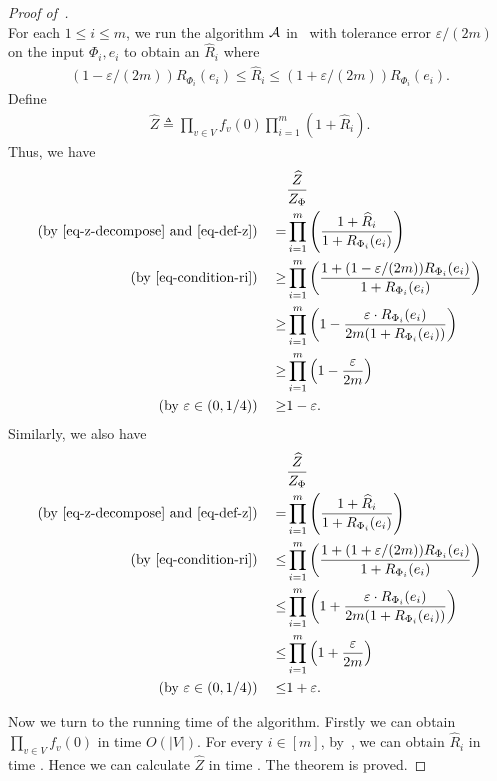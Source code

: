 \documentclass[11pt]{article}
\newcommand{\abs}[1]{\left\vert#1\right\vert}
\def\poly{\mathrm{poly}}
\newcommand{\wh}[1]{\widehat{#1}}
\newcommand{\hktodo}[1]{{\color{blue}{#1}}}
\begin{document}
\begin{proof}[Proof of~]
\begin{equation}
    \end{equation}
For each $1 \le i \le m$, we run the algorithm $\mathcal{A}$ in~ with tolerance error $\varepsilon/(2m)$ on the input $\Phi_i, e_i$ to obtain an $\wh{R}_i$
where 
\begin{align}\label{eq-condition-ri}
(1-\varepsilon/(2m))R_{\Phi_i}(e_i) \leq \wh{R}_i \leq (1+\varepsilon/(2m))R_{\Phi_i}(e_i).
\end{align}
Define 
\begin{align}\label{eq-def-z}
\wh{Z} \triangleq \prod_{v \in V} f_v(0) \prod_{i = 1}^{m} (1 + \wh{R}_i).
\end{align}
Thus, we have 
 \begin{align*}
    &\frac{\wh{Z}}{Z_\Phi} \\
\left(\text{by \eqref{eq-z-decompose} and \eqref{eq-def-z}}\right)\quad    = &\prod_{i = 1}^{m} \left( \frac{1 + \wh{R}_i}{1 + R_{\Phi_i}(e_i)}\right)\\ 
\left(\text{by \eqref{eq-condition-ri}}\right)\quad    \ge &\prod_{i = 1}^{m}  \left( \frac{1+(1-\varepsilon/(2m))R_{\Phi_i}(e_i) }{1 + R_{\Phi_i}(e_i)}\right)\\
 \ge &\prod_{i = 1}^{m} \left(1- \frac{\varepsilon\cdot R_{\Phi_i}(e_i)}{2m(1 + R_{\Phi_i}(e_i))}\right)\\ 
  \ge &\prod_{i = 1}^{m} \left(1- \frac{\varepsilon}{2m}\right)\\
\left(\text{by $\varepsilon\in (0,1/4)$}\right)\quad   \ge & 1 - \varepsilon.
\end{align*}
Similarly, we also have 
\begin{align*}
     &\frac{\wh{Z}}{Z_\Phi} \\
\left(\text{by \eqref{eq-z-decompose} and \eqref{eq-def-z}}\right)\quad    = &\prod_{i = 1}^{m} \left( \frac{1 + \wh{R}_i}{1 + R_{\Phi_i}(e_i)}\right)\\ 
\left(\text{by \eqref{eq-condition-ri}}\right)\quad    \leq &\prod_{i = 1}^{m}  \left( \frac{1+(1+\varepsilon/(2m))R_{\Phi_i}(e_i) }{1 + R_{\Phi_i}(e_i)}\right)
\\ \leq &\prod_{i = 1}^{m} \left(1+ \frac{\varepsilon\cdot R_{\Phi_i}(e_i)}{2m(1 + R_{\Phi_i}(e_i))}\right)\\ 
\leq&\prod_{i = 1}^{m} \left(1+ \frac{\varepsilon}{2m}\right) \\
\left(\text{by $\varepsilon\in (0,1/4)$}\right)\quad\le& 1 + \varepsilon.
\end{align*}

Now we turn to the running time of the algorithm.
Firstly we can obtain $\prod_{v \in V} f_v(0)$ in time $O(\abs{V})$. For every $i \in [m]$, by~, we can obtain $\wh{R}_i$ in time \hktodo{$\poly\left((m/\varepsilon)^{C(\Delta, r)}\right)\leq $}. Hence we can calculate $\wh{Z}$ in time \hktodo{$\poly\left((m/\varepsilon)^{C(\Delta, r)}\right)$}. 
The theorem is proved.
\end{proof}
\end{document}
